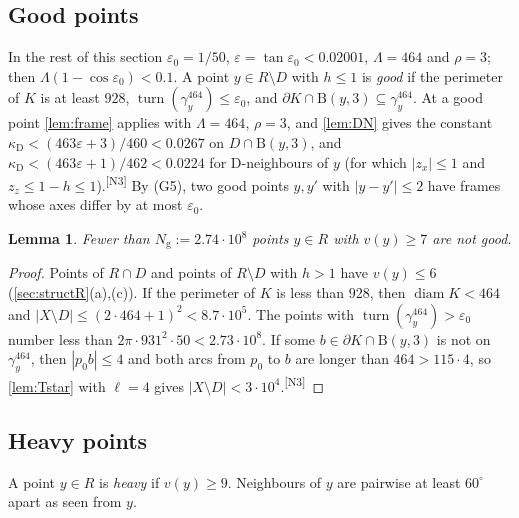 \documentclass[11pt]{amsart}
\newtheorem{lemma}[theorem]{Lemma}
\theoremstyle{definition}
\theoremstyle{remark}
\newcommand{\eps}{\varepsilon}
\newcommand{\turn}{\operatorname{turn}}
\newcommand{\Dd}{\mathrm{B}}      %
\newcommand{\chk}[1]{\textsuperscript{[#1]}}
\begin{document}
\subsection{Good points}
In the rest of this section $\eps_0=1/50$, $\eps=\tan\eps_0<0.02001$, $\Lambda=464$ and $\rho=3$; then $\Lambda(1-\cos\eps_0)<0.1$. A point $y\in R\setminus D$ with $h\le1$ is \emph{good} if the perimeter of $K$ is at least $928$, $\turn(\gamma^{464}_y)\le\eps_0$, and $\partial K\cap\Dd(y,3)\subseteq\gamma^{464}_y$. At a good point \cref{lem:frame} applies with $\Lambda=464$, $\rho=3$, and \cref{lem:DN} gives the constant $\kappa_{\mathrm D}<(463\eps+3)/460<0.0267$ on $D\cap\Dd(y,3)$, and $\kappa_{\mathrm D}<(463\eps+1)/462<0.0224$ for D-neighbours of $y$ (for which $|z_x|\le1$ and $z_z\le1-h\le1$).\chk{N3} By (G5), two good points $y,y'$ with $|y-y'|\le2$ have frames whose axes differ by at most $\eps_0$.

\begin{lemma}\label{lem:fewbad}
Fewer than $N_{\mathrm g}:=2.74\cdot10^8$ points $y\in R$ with $v(y)\ge7$ are not good.
\end{lemma}
\begin{proof}
Points of $R\cap D$ and points of $R\setminus D$ with $h>1$ have $v(y)\le6$ (\cref{sec:structR}(a),(c)). If the perimeter of $K$ is less than $928$, then $\operatorname{diam}K<464$ and $|X\setminus D|\le(2\cdot464+1)^2<8.7\cdot10^5$. The points with $\turn(\gamma^{464}_y)>\eps_0$ number less than $2\pi\cdot931^2\cdot50<2.73\cdot10^8$. If some $b\in\partial K\cap\Dd(y,3)$ is not on $\gamma^{464}_y$, then $|p_0b|\le4$ and both arcs from $p_0$ to $b$ are longer than $464>115\cdot4$, so \cref{lem:Tstar} with $\ell=4$ gives $|X\setminus D|<3\cdot10^4$.\chk{N3}
\end{proof}

\subsection{Heavy points}
A point $y\in R$ is \emph{heavy} if $v(y)\ge9$. Neighbours of $y$ are pairwise at least $60^\circ$ apart as seen from $y$.
\end{document}
